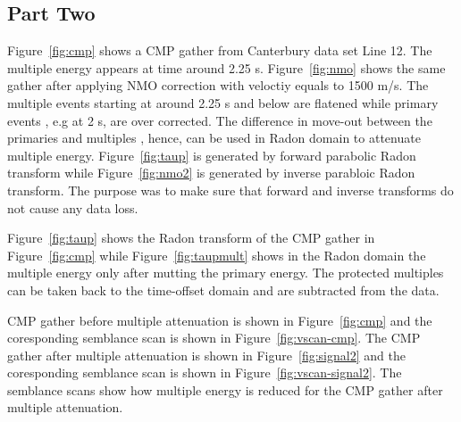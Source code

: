 \subsection{Part Two}




Figure~\ref{fig:cmp} shows a CMP gather from Canterbury data set Line 12. The multiple energy appears at time around 2.25 s. Figure~\ref{fig:nmo} shows the same gather after applying NMO correction with veloctiy equals to 1500 m/s. The multiple events starting at around 2.25 s and below are flatened while primary events , e.g at 2 s,  are over corrected. The difference in move-out between the primaries and multiples , hence, can be used in Radon domain to attenuate multiple energy. Figure~\ref{fig:taup} is generated by forward parabolic Radon transform while Figure~\ref{fig:nmo2} is generated by inverse parabloic Radon transform. The purpose was to make sure that forward and inverse transforms do not cause any data loss.



Figure~\ref{fig:taup} shows the Radon transform of the CMP gather in Figure~\ref{fig:cmp} while Figure~\ref{fig:taupmult} shows in the Radon domain the multiple energy only after mutting the primary energy. The protected multiples can be taken back to the time-offset domain and are subtracted from the data.


CMP gather before multiple attenuation is shown in Figure~\ref{fig:cmp} and the coresponding semblance scan is shown in Figure~\ref{fig:vscan-cmp}. The CMP gather after multiple attenuation is shown in Figure~\ref{fig:signal2} and the coresponding semblance scan is shown in Figure~\ref{fig:vscan-signal2}. The semblance scans show how multiple energy is reduced for the CMP gather after multiple attenuation.

